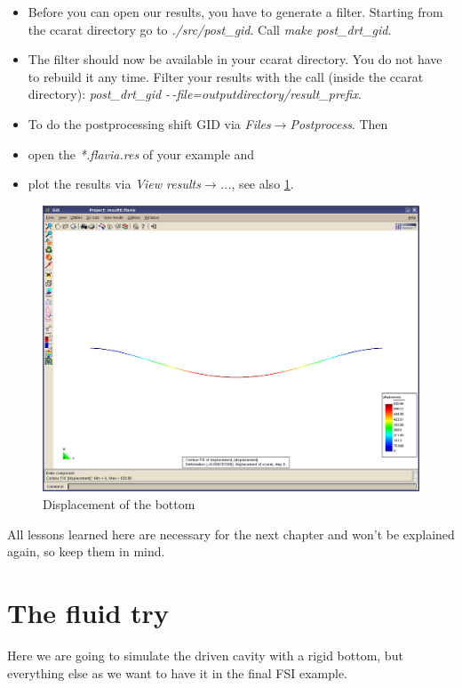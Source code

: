 \begin{itemize}
\item Before you can open our results, you have to generate a filter. Starting from the ccarat directory go to \emph{./src/post\_gid}. Call \emph{make post\_drt\_gid}.
\item The filter should now be available in your ccarat directory. You do not have to rebuild it any time. Filter your results with the call (inside the ccarat directory): \emph{post\_drt\_gid -\,-file=outputdirectory/result\_prefix}.
\item To do the postprocessing shift GID via \emph{Files$\to$Postprocess}.
Then 
\item open the \emph{{*}.flavia.res} of your example and 
\item plot the results via \emph{View results$\to$...}, see also \ref{tut_fsi:3.3}.
\end{itemize}
%
\begin{figure}[h]
\includegraphics[width=1\columnwidth]{Bilder/structure_03}


\caption{\label{tut_fsi:3.3} Displacement of the bottom}
\end{figure}


All lessons learned here are necessary for the next chapter and won't
be explained again, so keep them in mind.


\section{The fluid try}

Here we are going to simulate the driven cavity with a rigid bottom,
but everything else as we want to have it in the final FSI example.


